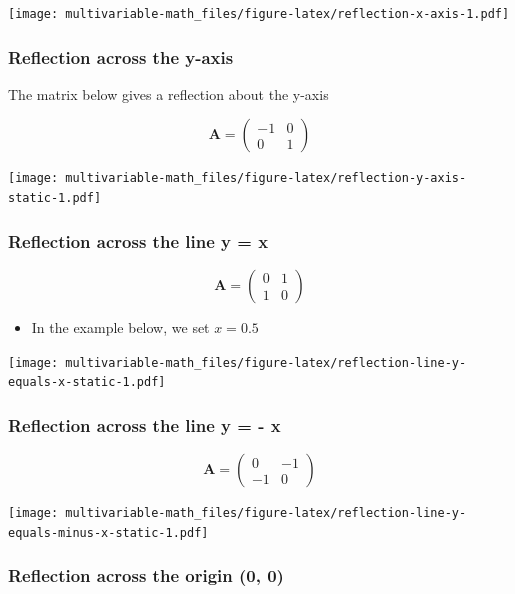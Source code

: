 \documentclass[
]{book}
\providecommand{\tightlist}{%
  \setlength{\itemsep}{0pt}\setlength{\parskip}{0pt}}
\theoremstyle{definition}
\theoremstyle{definition}
\theoremstyle{definition}
\theoremstyle{remark}
\begin{document}
\texttt{[image: multivariable-math\_files/figure-latex/reflection-x-axis-1.pdf]}

\hypertarget{reflection-across-the-y-axis}{%
\subsubsection{Reflection across the y-axis}\label{reflection-across-the-y-axis}}

The matrix below gives a reflection about the y-axis

\[
\mathbf{A} = \begin{pmatrix}
-1 & 0 \\
0 & 1
\end{pmatrix}
\]

\texttt{[image: multivariable-math\_files/figure-latex/reflection-y-axis-static-1.pdf]}

\hypertarget{reflection-across-the-line-y-x}{%
\subsubsection{Reflection across the line y = x}\label{reflection-across-the-line-y-x}}

\[
\mathbf{A} = \begin{pmatrix}
0 & 1 \\
1 & 0
\end{pmatrix}
\]

\begin{itemize}
\tightlist
\item
  In the example below, we set \(x = 0.5\)
\end{itemize}

\texttt{[image: multivariable-math\_files/figure-latex/reflection-line-y-equals-x-static-1.pdf]}

\hypertarget{reflection-across-the-line-y---x}{%
\subsubsection{Reflection across the line y = - x}\label{reflection-across-the-line-y---x}}

\[
\mathbf{A} = \begin{pmatrix}
0 & -1 \\
-1 & 0
\end{pmatrix}
\]

\texttt{[image: multivariable-math\_files/figure-latex/reflection-line-y-equals-minus-x-static-1.pdf]}

\hypertarget{reflection-across-the-origin-0-0}{%
\subsubsection{Reflection across the origin (0, 0)}\label{reflection-across-the-origin-0-0}}
\end{document}
